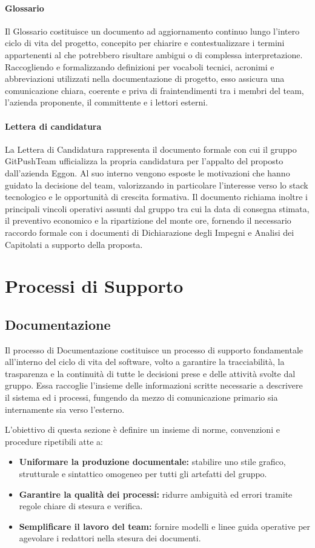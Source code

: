 \documentclass[documento]{gpt}
\newcommand{\subsubsubsection}[1]{\paragraph{#1}}
\begin{document}
	\subsubsubsection{Glossario}
	Il Glossario costituisce un documento ad aggiornamento continuo lungo l'intero ciclo di vita del progetto, concepito per chiarire e contestualizzare i termini appartenenti al  che potrebbero risultare ambigui o di complessa interpretazione. Raccogliendo e formalizzando definizioni per vocaboli tecnici, acronimi e abbreviazioni utilizzati nella documentazione di progetto, esso assicura una comunicazione chiara, coerente e priva di fraintendimenti tra i membri del team, l'azienda proponente, il committente e i lettori esterni.
	
	\subsubsubsection{Lettera di candidatura}\label{sec:lettera_di_presentazione}
	La Lettera di Candidatura rappresenta il documento formale con cui il gruppo GitPushTeam ufficializza la propria candidatura per l'appalto del  proposto dall'azienda Eggon. Al suo interno vengono esposte le motivazioni che hanno guidato la decisione del team, valorizzando in particolare l'interesse verso lo stack tecnologico e le opportunità di crescita formativa. Il documento richiama inoltre i principali vincoli operativi assunti dal gruppo tra cui la data di consegna stimata, il preventivo economico e la ripartizione del monte ore, fornendo il necessario raccordo formale con i documenti di Dichiarazione degli Impegni e Analisi dei Capitolati a supporto della proposta.
	
	
	
	\section{Processi di Supporto}
	
	\subsection{Documentazione}
	Il processo di Documentazione costituisce un processo di supporto fondamentale all'interno del ciclo di vita del software, volto a garantire la tracciabilità, la trasparenza e la continuità di tutte le decisioni prese e delle attività svolte dal gruppo. Essa raccoglie l'insieme delle informazioni scritte necessarie a descrivere il sistema ed i processi, fungendo da mezzo di comunicazione primario sia internamente sia verso l'esterno.
	
	L'obiettivo di questa sezione è definire un insieme di norme, convenzioni e procedure ripetibili atte a:
	\begin{itemize}
		\item \textbf{Uniformare la produzione documentale:} stabilire uno stile grafico, strutturale e sintattico omogeneo per tutti gli artefatti del gruppo.
		\item \textbf{Garantire la qualità dei processi:} ridurre ambiguità ed errori tramite regole chiare di stesura e verifica.
		\item \textbf{Semplificare il lavoro del team:} fornire modelli e linee guida operative per agevolare i redattori nella stesura dei documenti.
	\end{itemize}
	
\end{document}
